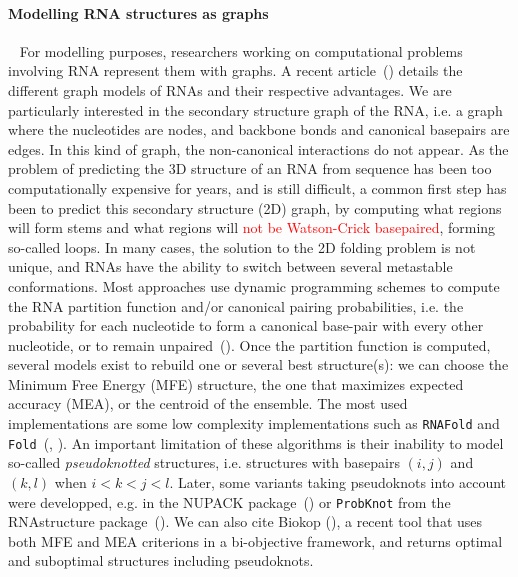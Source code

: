 \documentclass{bioinfo}
\begin{document}
\paragraph{Modelling RNA structures as graphs} ~ 
For modelling purposes, researchers working on computational problems involving RNA represent them with graphs.  A recent article~(\citealp{schlick2018adventures}) details the different graph models of RNAs and their respective advantages. 
We are particularly interested in the secondary structure graph of the RNA, i.e. a graph where the nucleotides are nodes, and backbone bonds and canonical basepairs are edges. In this kind of graph, the non-canonical interactions do not appear. 
As the problem of predicting the 3D structure of an RNA from sequence has been too computationally expensive for years, and is still difficult, a common first step has been to predict this secondary structure (2D) graph, by computing what regions will form stems and what regions will \textcolor{red}{not be Watson-Crick basepaired}, forming so-called loops. 
In many cases, the solution to the 2D folding problem is not unique, and RNAs have the ability to switch between several metastable conformations. Most approaches use dynamic programming schemes to compute the RNA partition function and/or canonical pairing probabilities, i.e. the probability for each nucleotide to form a canonical base-pair with every other nucleotide, or to remain unpaired~(\citealp{mccaskill1990equilibrium}). Once the  partition function is computed, several models exist to rebuild one or several best structure(s): we can choose the Minimum Free Energy (MFE) structure, the one that maximizes expected accuracy (MEA), or the centroid of the ensemble. The most used implementations are some low complexity implementations such as \texttt{RNAFold} and \texttt{Fold}~(\citealp{lorenz2011viennarna}, \citealp{mathews2004using}). An important limitation of these algorithms is their inability to model so-called \textit{pseudoknotted} structures, i.e. structures with basepairs $(i,j)$ and $(k,l)$ when $i<k<j<l$. 
Later, some variants taking pseudoknots into account were developped, e.g. in the NUPACK package~(\citealp{dirksAlgorithmComputingNucleic2004}) or \texttt{ProbKnot} from the RNAstructure package~(\citealp{bellaousov2010probknot}).
We can also cite Biokop (\citealp{legendre_bi-objective_2018}), a recent tool that uses both MFE and MEA criterions in a bi-objective framework, and returns optimal and suboptimal structures including pseudoknots.
\end{document}
